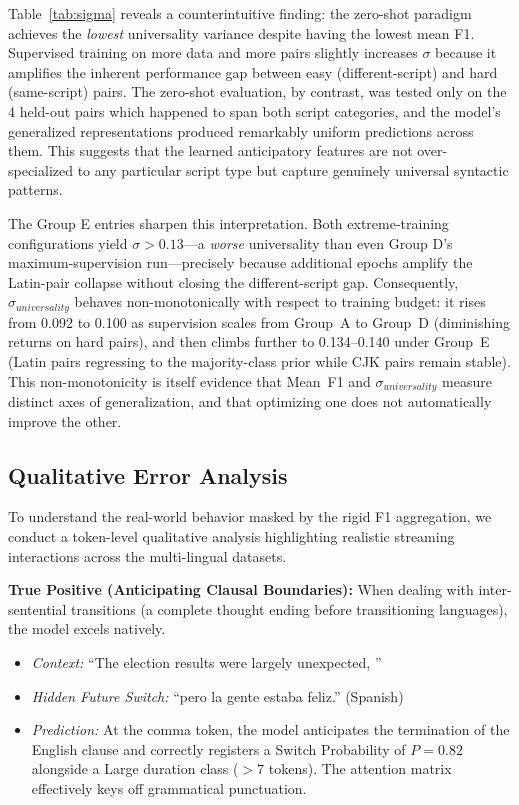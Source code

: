 \documentclass[sigconf,nonacm]{acmart}
\begin{document}
Table~\ref{tab:sigma} reveals a counterintuitive finding: the zero-shot paradigm achieves the \textit{lowest} universality variance despite having the lowest mean F1. Supervised training on more data and more pairs slightly increases $\sigma$ because it amplifies the inherent performance gap between easy (different-script) and hard (same-script) pairs. The zero-shot evaluation, by contrast, was tested only on the 4 held-out pairs which happened to span both script categories, and the model's generalized representations produced remarkably uniform predictions across them. This suggests that the learned anticipatory features are not over-specialized to any particular script type but capture genuinely universal syntactic patterns.

The Group E entries sharpen this interpretation. Both extreme-training configurations yield $\sigma > 0.13$---a \textit{worse} universality than even Group D's maximum-supervision run---precisely because additional epochs amplify the Latin-pair collapse without closing the different-script gap. Consequently, $\sigma_{universality}$ behaves non-monotonically with respect to training budget: it rises from 0.092 to 0.100 as supervision scales from Group~A to Group~D (diminishing returns on hard pairs), and then climbs further to 0.134--0.140 under Group~E (Latin pairs regressing to the majority-class prior while CJK pairs remain stable). This non-monotonicity is itself evidence that Mean~F1 and $\sigma_{universality}$ measure distinct axes of generalization, and that optimizing one does not automatically improve the other.

\subsection{Qualitative Error Analysis}
To understand the real-world behavior masked by the rigid F1 aggregation, we conduct a token-level qualitative analysis highlighting realistic streaming interactions across the multi-lingual datasets. 

\textbf{True Positive (Anticipating Clausal Boundaries):}
When dealing with inter-sentential transitions (a complete thought ending before transitioning languages), the model excels natively. 
\begin{itemize}
    \item \textit{Context:} ``The election results were largely unexpected, ''
    \item \textit{Hidden Future Switch:} ``pero la gente estaba feliz.'' (Spanish)
    \item \textit{Prediction:} At the comma token, the model anticipates the termination of the English clause and correctly registers a Switch Probability of \( P = 0.82 \) alongside a Large duration class (\( > 7 \) tokens). The attention matrix effectively keys off grammatical punctuation.
\end{itemize}
\end{document}
